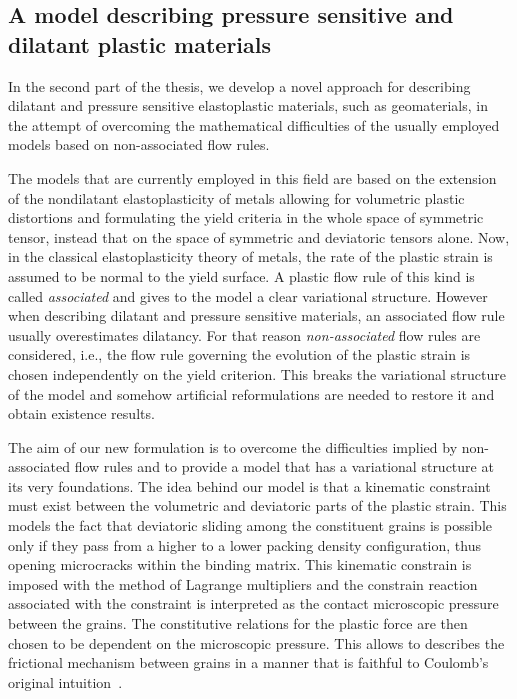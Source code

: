 \documentclass[a4paper,10pt,twoside]{amsbook}
\numberwithin{section}{chapter}
\numberwithin{equation}{chapter}
\theoremstyle{definition}
\begin{document}
\subsection*{A model describing pressure sensitive and dilatant plastic materials}

In the second part of the thesis, we develop a novel approach for describing dilatant and pressure sensitive elastoplastic materials, such as geomaterials, in the attempt of overcoming the mathematical difficulties of the usually employed models based on non-associated flow rules.

The models that are currently employed in this field are based on the extension of the nondilatant elastoplasticity of metals allowing for volumetric plastic distortions and formulating the yield criteria in the whole space of symmetric tensor, instead that on the space of symmetric and deviatoric tensors alone. Now, in the classical elastoplasticity theory of metals, the rate of the plastic strain is assumed to be normal to the yield surface. A plastic flow rule of this kind is called \emph{associated} and gives to the model a clear variational structure. However when describing dilatant and pressure sensitive materials, an associated flow rule usually overestimates dilatancy. For that reason \emph{non-associated} flow rules are considered, i.e., the flow rule governing the evolution of the plastic strain is chosen independently on the yield criterion. This breaks the variational structure of the model and somehow artificial reformulations are needed to restore it and obtain existence results.

The aim of our new formulation is to overcome the difficulties implied by non-associated flow rules and to provide a model that has a variational structure at its very foundations. The idea behind our model is that a kinematic constraint must exist between the volumetric and deviatoric parts of the plastic strain. This models the fact that deviatoric sliding among the constituent grains is possible only if they pass from a higher to a lower packing density configuration, thus opening microcracks within the binding matrix. This kinematic constrain is imposed with the method of Lagrange multipliers and the constrain reaction associated with the constraint is interpreted as the contact microscopic pressure between the grains. The constitutive relations for the plastic force are then chosen to be dependent on the microscopic pressure. This allows to describes the frictional mechanism between grains in a manner that is faithful to Coulomb's original intuition~\cite{Coulomb1776}.
\end{document}
